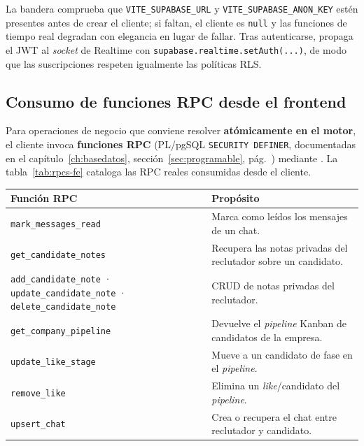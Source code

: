\begin{NotaTecnica}
La bandera  comprueba que \texttt{VITE\_SUPABASE\_URL} y
\texttt{VITE\_SUPABASE\_ANON\_KEY} estén presentes antes de crear el cliente; si faltan, el
cliente es \texttt{null} y las funciones de tiempo real degradan con elegancia en lugar de
fallar. Tras autenticarse,  propaga el JWT al \textit{socket}
de Realtime con \texttt{supabase.realtime.setAuth(...)}, de modo que las suscripciones
respeten igualmente las políticas RLS.
\end{NotaTecnica}

\subsection{Consumo de funciones RPC desde el frontend}
\label{subsec:supabase_rpc}

Para operaciones de negocio que conviene resolver \textbf{atómicamente en el motor}, el
cliente invoca \textbf{funciones RPC} (PL/pgSQL \texttt{SECURITY DEFINER}, documentadas en
el capítulo~\ref{ch:basedatos}, sección~\ref{sec:programable},
pág.~\pageref{sec:programable}) mediante . La
tabla~\ref{tab:rpcs-fe} cataloga las RPC reales consumidas desde el cliente.

\vspace{0.2cm}
\noindent
\renewcommand{\arraystretch}{1.3}
\fontsize{8.5}{10.2}\selectfont\sffamily
\begin{tabularx}{\textwidth}{|L{4.4cm}|Y|}
\hline
{}
\sffamily\textbf{Función RPC} & \sffamily\textbf{Propósito} \\
\hline
\texttt{mark\_messages\_read} & Marca como leídos los mensajes de un chat. \\ \hline
{}
\texttt{get\_candidate\_notes} & Recupera las notas privadas del reclutador sobre un candidato. \\ \hline
\texttt{add\_candidate\_note} · \texttt{update\_candidate\_note} · \texttt{delete\_candidate\_note} & CRUD de notas privadas del reclutador. \\ \hline
{}
\texttt{get\_company\_pipeline} & Devuelve el \textit{pipeline} Kanban de candidatos de la empresa. \\ \hline
\texttt{update\_like\_stage} & Mueve a un candidato de fase en el \textit{pipeline}. \\ \hline
{}
\texttt{remove\_like} & Elimina un \textit{like}/candidato del \textit{pipeline}. \\ \hline
\texttt{upsert\_chat} & Crea o recupera el chat entre reclutador y candidato. \\ \hline
\end{tabularx}
\label{tab:rpcs-fe}

